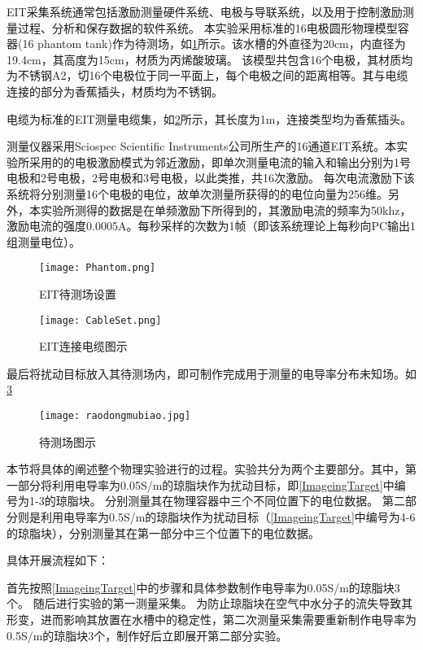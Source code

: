 EIT采集系统通常包括激励测量硬件系统、电极与导联系统，以及用于控制激励测量过程、分析和保存数据的软件系统。
本实验采用标准的16电极圆形物理模型容器(16 phantom tank)作为待测场，如\cref{figure:Phantom}所示。该水槽的外直径为20cm，内直径为19.4cm，其高度为15cm，材质为丙烯酸玻璃。
该模型共包含16个电极，其材质均为不锈钢A2，切16个电极位于同一平面上，每个电极之间的距离相等。其与电缆连接的部分为香蕉插头，材质均为不锈钢。

电缆为标准的EIT测量电缆集，如\cref{figure:CableSet}所示，其长度为1m，连接类型均为香蕉插头。

测量仪器采用Sciospec Scientific Instruments公司所生产的16通道EIT系统。本实验所采用的的电极激励模式为邻近激励，即单次测量电流的输入和输出分别为1号电极和2号电极，2号电极和3号电极，以此类推，共16次激励。
每次电流激励下该系统将分别测量16个电极的电位，故单次测量所获得的的电位向量为256维。另外，本实验所测得的数据是在单频激励下所得到的，其激励电流的频率为50khz，
激励电流的强度0.0005A。每秒采样的次数为1帧（即该系统理论上每秒向PC输出1组测量电位）。

\begin{figure}
    \centering
    \texttt{[image: Phantom.png]}
    \caption{EIT待测场设置}
    \label{figure:Phantom}
\end{figure}

\begin{figure}
    \centering
    \texttt{[image: CableSet.png]}
    \caption{EIT连接电缆图示}
    \label{figure:CableSet}
\end{figure}

最后将扰动目标放入其待测场内，即可制作完成用于测量的电导率分布未知场。如\cref{figure:raodongmubiao}
\begin{figure}[h]
    \centering
    \texttt{[image: raodongmubiao.jpg]}
    \caption{待测场图示}
    \label{figure:raodongmubiao}
\end{figure}


本节将具体的阐述整个物理实验进行的过程。实验共分为两个主要部分。其中，第一部分将利用电导率为0.05S/m的琼脂块作为扰动目标，即\cref{ImageingTarget}中编号为1-3的琼脂块。
分别测量其在物理容器中三个不同位置下的电位数据。
第二部分则是利用电导率为0.5S/m的琼脂块作为扰动目标（\cref{ImageingTarget}中编号为4-6的琼脂块），分别测量其在第一部分中三个位置下的电位数据。

具体开展流程如下：

首先按照\cref{ImageingTarget}中的步骤和具体参数制作电导率为0.05S/m的琼脂块3个。
随后进行实验的第一测量采集。
为防止琼脂块在空气中水分子的流失导致其形变，进而影响其放置在水槽中的稳定性，第二次测量采集需要重新制作电导率为0.5S/m的琼脂块3个，制作好后立即展开第二部分实验。

